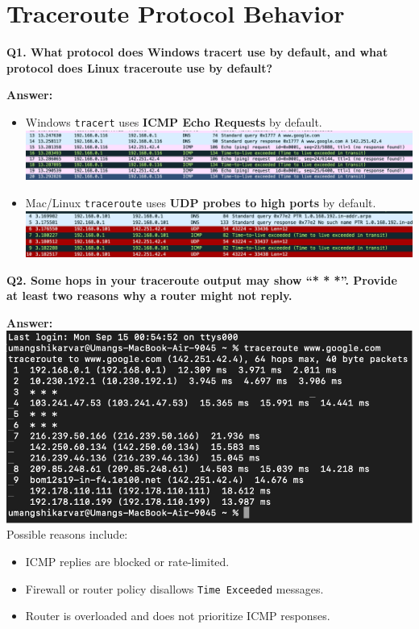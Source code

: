 \documentclass[12pt, a4paper]{report}
\begin{document}
\chapter{Traceroute Protocol Behavior}

\textbf{Q1. What protocol does Windows tracert use by default, and what protocol does Linux traceroute use by default?}

\textbf{Answer:}  
\begin{itemize}[leftmargin=*]
    \item Windows \texttt{tracert} uses \textbf{ICMP Echo Requests} by default.
    \\
    \includegraphics[width=1\linewidth]{images/image.png}
    \item Mac/Linux \texttt{traceroute} uses \textbf{UDP probes to high ports} by default.
    \\
    \includegraphics[width=1\linewidth]{images/image copy.png}
\end{itemize}

\textbf{Q2. Some hops in your traceroute output may show ``* * *''. Provide at least two reasons why a router might not reply.}

\textbf{Answer:}
\\  
\includegraphics[width=1\linewidth]{images/Picture 1.png}
Possible reasons include:
\begin{itemize}[leftmargin=*]
    \item ICMP replies are blocked or rate-limited.  
    \item Firewall or router policy disallows \texttt{Time Exceeded} messages.  
    \item Router is overloaded and does not prioritize ICMP responses.
\end{itemize}
\end{document}
